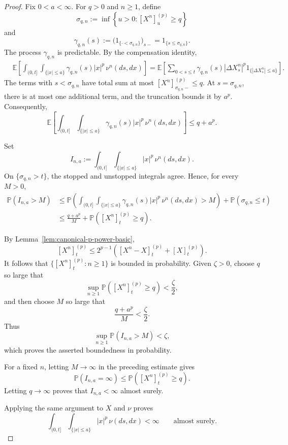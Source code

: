 \documentclass[a4paper,10pt]{article}
\renewcommand{\P}{\mathbb P}
\begin{document}
\begin{proof}
Fix \(0<a<\infty\). For \(q>0\) and \(n\ge1\), define
\[
\sigma_{q,n}
:=
\inf\left\{
u>0:
[X^n]^{(p)}_u\ge q
\right\}
\]
and
\[
\gamma_{q,n}(s)
:=
\bigl(1_{\{\cdot<\sigma_{q,n}\}}\bigr)_{s-}
=
1_{\{s\le\sigma_{q,n}\}}.
\]
The process \(\gamma_{q,n}\) is predictable. By the compensation
identity,
\[
\begin{aligned}
&\mathbb E\left[
\int_{(0,t]}\int_{\{|x|\le a\}}
\gamma_{q,n}(s)|x|^p\,\nu^n(ds,dx)
\right]
=
\mathbb E\left[
\sum_{0<s\le t}
\gamma_{q,n}(s)
|\Delta X^n_s|^p
1_{\{|\Delta X^n_s|\le a\}}
\right].
\end{aligned}
\]
The terms with \(s<\sigma_{q,n}\) have total sum at most
$
        [X^n]^{(p)}_{\sigma_{q,n}-}
        \le q.
$
At \(s=\sigma_{q,n}\), there is at most one additional term, and the
truncation bounds it by \(a^p\). Consequently,
\[
\mathbb E\left[
\int_{(0,t]}\int_{\{|x|\le a\}}
\gamma_{q,n}(s)|x|^p\,\nu^n(ds,dx)
\right]
\le
q+a^p.
\]

Set
\[
I_{n,a}
:=
\int_{(0,t]}\int_{\{|x|\le a\}}
|x|^p\,\nu^n(ds,dx).
\]
On \(\{\sigma_{q,n}>t\}\), the stopped and unstopped integrals agree.
Hence, for every \(M>0\),
\[
\begin{aligned}
\P(I_{n,a}>M)
&\le
\P\left(
\int_{(0,t]}\int_{\{|x|\le a\}}
\gamma_{q,n}(s)|x|^p\,\nu^n(ds,dx)
>
M
\right)
+
\P(\sigma_{q,n}\le t)
\\
&\le
\frac{q+a^p}{M}
+
\P\left([X^n]^{(p)}_t\ge q\right).
\end{aligned}
\]

By Lemma~\ref{lem:canonical-p-power-basic},
\[
[X^n]^{(p)}_t
\le
2^{p-1}
\left(
[X^n-X]^{(p)}_t+[X]^{(p)}_t
\right).
\]
It follows that
$
        \{[X^n]^{(p)}_t:n\ge1\}
$
is bounded in probability. Given \(\zeta>0\), choose \(q\) so large
that
\[
\sup_{n\ge1}
\P\left([X^n]^{(p)}_t\ge q\right)
<
\frac{\zeta}{2},
\]
and then choose \(M\) so large that
\[
        \frac{q+a^p}{M}
        <
        \frac{\zeta}{2}.
\]
Thus
\[
        \sup_{n\ge1}\P(I_{n,a}>M)<\zeta,
\]
which proves the asserted boundedness in probability.

For a fixed \(n\), letting \(M\to\infty\) in the preceding estimate
gives
\[
\P(I_{n,a}=\infty)
\le
\P\left([X^n]^{(p)}_t\ge q\right).
\]
Letting \(q\to\infty\) proves that \(I_{n,a}<\infty\) almost surely.

Applying the same argument to \(X\) and \(\nu\) proves
\[
\int_{(0,t]}\int_{\{|x|\le a\}}
|x|^p\,\nu(ds,dx)
<
\infty
\qquad\text{almost surely}.
\]
\end{proof}
\end{document}
